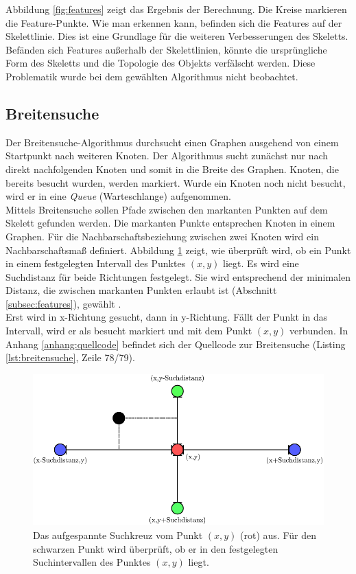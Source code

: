 Abbildung \ref{fig:features} zeigt das Ergebnis der Berechnung. Die Kreise markieren die Feature-Punkte. Wie man erkennen kann, befinden sich die Features auf der Skelettlinie. Dies ist eine Grundlage für die weiteren
Verbesserungen des Skeletts. Befänden sich Features außerhalb der Skelettlinien, könnte die ursprüngliche Form des Skeletts und die Topologie des Objekts verfälscht werden. Diese Problematik wurde bei dem gewählten
Algorithmus \cite{extracting_skeletons_distancemaps} nicht beobachtet.
\subsection{Breitensuche}
\label{subsec:breitesuche}
Der Breitensuche-Algorithmus durchsucht einen Graphen ausgehend von einem Startpunkt nach weiteren 
Knoten. Der Algorithmus sucht zunächst nur nach direkt nachfolgenden Knoten und somit in die Breite des
Graphen. Knoten, die bereits besucht wurden, werden markiert. Wurde ein Knoten noch nicht besucht, wird er
in eine \emph{Queue} (Warteschlange) aufgenommen.\\
Mittels Breitensuche sollen Pfade zwischen den markanten Punkten auf dem Skelett gefunden werden. Die markanten Punkte entsprechen Knoten in einem Graphen. Für die Nachbarschaftsbeziehung zwischen zwei
Knoten wird ein Nachbarschaftsmaß definiert. Abbildung \ref{fig:suchdistanz_naechster_nachbar} zeigt, wie überprüft wird, ob ein Punkt in einem festgelegten Intervall des Punktes $(x,y)$ liegt. Es wird eine Suchdistanz für beide Richtungen festgelegt. Sie
wird entsprechend der minimalen Distanz, die zwischen markanten Punkten erlaubt ist (Abschnitt \ref{subsec:features}), gewählt . \\
Erst wird in x-Richtung gesucht, dann in y-Richtung. Fällt der Punkt in das Intervall, wird er als besucht markiert und
mit dem Punkt $(x,y)$ verbunden. 
In Anhang \ref{anhang:quellcode} befindet sich der Quellcode zur Breitensuche (Listing \ref{lst:breitensuche}, Zeile 78/79).
\begin{figure}[htbp]
\centering
\includegraphics[width=1.0\linewidth]{./fig/suchdistanz_naechster_nachbar}
\caption{Das aufgespannte Suchkreuz vom Punkt $(x,y)$ (rot) aus. Für den schwarzen Punkt wird überprüft, ob er in den festgelegten Suchintervallen des Punktes $(x,y)$ liegt.}
\label{fig:suchdistanz_naechster_nachbar}
\end{figure}\\
